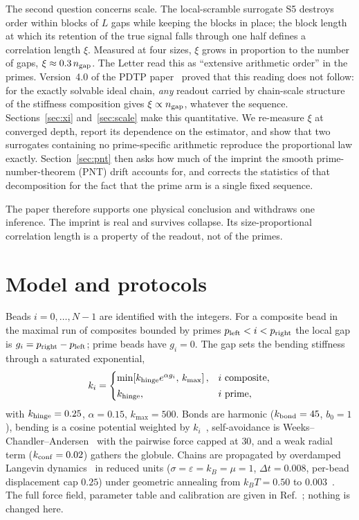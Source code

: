 \documentclass[reprint,amsmath,amssymb,aps,pre,longbibliography]{revtex4-2}
\begin{document}
The second question concerns scale. The local-scramble surrogate S5 destroys order within
blocks of $L$ gaps while keeping the blocks in place; the block length at which its retention
of the true signal falls through one half defines a correlation length $\xi$. Measured at four
sizes, $\xi$ grows in proportion to the number of gaps, $\xi\approx0.3\,n_{\rm gap}$. The
Letter read this as ``extensive arithmetic order'' in the primes. Version~4.0 of the PDTP
paper~\cite{PDTP4} proved that this reading does not follow: for the exactly solvable ideal
chain, \emph{any} readout carried by chain-scale structure of the stiffness composition gives
$\xi\propto n_{\rm gap}$, whatever the sequence. Sections~\ref{sec:xi} and~\ref{sec:scale}
make this quantitative. We re-measure $\xi$ at converged depth, report its dependence on the
estimator, and show that two surrogates containing no prime-specific arithmetic reproduce the
proportional law exactly. Section~\ref{sec:pnt} then asks how much of the imprint the smooth
prime-number-theorem (PNT) drift accounts for, and corrects the statistics of that
decomposition for the fact that the prime arm is a single fixed sequence.

The paper therefore supports one physical conclusion and withdraws one inference. The imprint
is real and survives collapse. Its size-proportional correlation length is a property of the
readout, not of the primes.

\section{Model and protocols}\label{sec:model}

Beads $i=0,\dots,N-1$ are identified with the integers. For a composite bead in the maximal
run of composites bounded by primes $p_{\rm left}<i<p_{\rm right}$ the local gap is
$g_i=p_{\rm right}-p_{\rm left}$; prime beads have $g_i=0$. The gap sets the bending stiffness
through a saturated exponential,
\begin{equation}
k_i=\begin{cases}
\min\!\left[k_{\rm hinge}e^{\alpha g_i},\,k_{\max}\right], & i\ \text{composite},\\[2pt]
k_{\rm hinge}, & i\ \text{prime},
\end{cases}
\label{eq:stiff}
\end{equation}
with $k_{\rm hinge}=0.25$, $\alpha=0.15$, $k_{\max}=500$. Bonds are harmonic
($k_{\rm bond}=45$, $b_0=1$), bending is a cosine potential weighted by
$k_i$~\cite{KratkyPorod,Montesi}, self-avoidance is Weeks--Chandler--Andersen~\cite{WCA}
with the pairwise force capped at $30$, and a weak radial term ($k_{\rm conf}=0.02$) gathers
the globule. Chains are propagated by overdamped Langevin dynamics~\cite{Ermak} in reduced
units ($\sigma=\varepsilon=k_B=\mu=1$, $\Delta t=0.008$, per-bead displacement cap $0.25$)
under geometric annealing from $k_BT=0.50$ to $0.003$~\cite{Kirkpatrick}. The full force
field, parameter table and calibration are given in Ref.~\cite{PDTP4}; nothing is changed
here.
\end{document}
